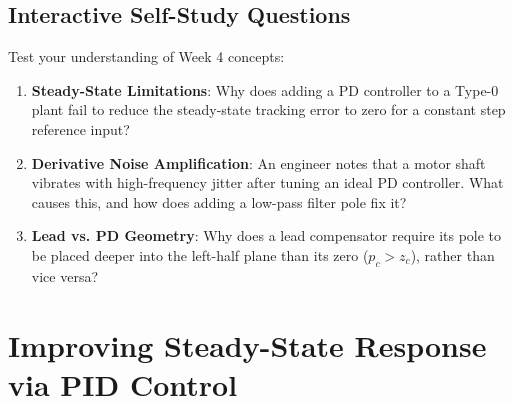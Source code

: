 \documentclass[12pt,onecolumn,twoside ]{article}
\begin{document}
	\subsection{Interactive Self-Study Questions}
	Test your understanding of Week 4 concepts:
	\begin{enumerate}
		\item
		\textbf{Steady-State Limitations}: Why does adding a PD controller to a Type-0 plant fail to reduce the steady-state tracking error to zero for a constant step reference input?
		\item
		\textbf{Derivative Noise Amplification}: An engineer notes that a motor shaft vibrates with high-frequency jitter after tuning an ideal PD controller. What causes this, and how does adding a low-pass filter pole fix it?
		\item
		\textbf{Lead vs. PD Geometry}: Why does a lead compensator require its pole to be placed deeper into the left-half plane than its zero ($p_c > z_c$), rather than vice versa?
	\end{enumerate}
	
	\newpage
	\section{Improving Steady-State Response via PID Control}	
\end{document}
